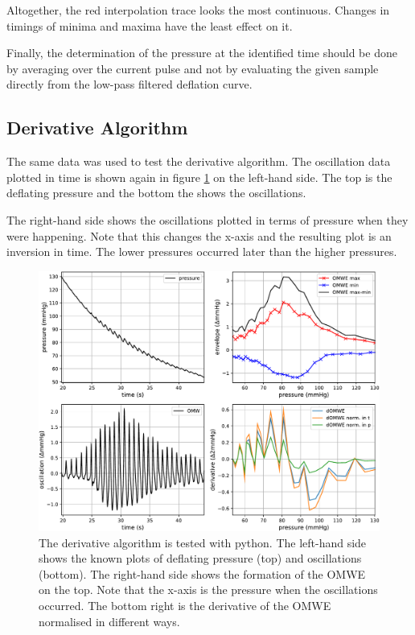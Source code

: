 Altogether, the red interpolation trace looks the most continuous. Changes in timings of minima and maxima have the least effect on it. 

Finally, the determination of the pressure at the identified time should be done by averaging over the current pulse and not by evaluating the given sample directly from the low-pass filtered deflation curve.

\subsection{Derivative Algorithm}\label{sec:pyder}
The same data was used to test the derivative algorithm. The oscillation data plotted in time is shown again in figure \ref{fig:pyDer} on the left-hand side. The top is the deflating pressure and the bottom the shows the oscillations.

The right-hand side shows the oscillations plotted in terms of pressure when they were happening. Note that this changes the x-axis and the resulting plot is an inversion in time. The lower pressures occurred later than the higher pressures. 

\begin{figure}[ht!]
\centering
\includegraphics[width=\textwidth]{figures/derrivative_envelope.pdf}
\caption{The derivative algorithm is tested with python. The left-hand side shows the known plots of deflating pressure (top) and oscillations (bottom). The right-hand side shows the formation of the OMWE on the top. Note that the x-axis is the pressure when the oscillations occurred. The bottom right is the derivative of the OMWE normalised in different ways.}
\label{fig:pyDer}
\end{figure} 

